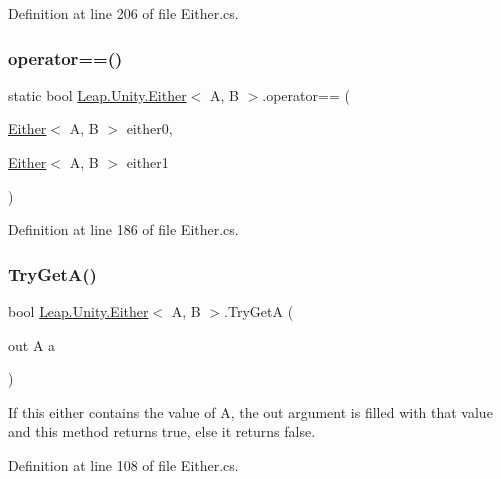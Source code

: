 Definition at line 206 of file Either.\+cs.

\mbox{\label{struct_leap_1_1_unity_1_1_either_ac635dd45bbe22cd73bb1c850d7294087}} 
\subsubsection{\texorpdfstring{operator==()}{operator==()}}
{\footnotesize\ttfamily static bool \mbox{\hyperlink{struct_leap_1_1_unity_1_1_either}{Leap.\+Unity.\+Either}}$<$ A, B $>$.operator== (\begin{DoxyParamCaption}\item[{\mbox{\hyperlink{struct_leap_1_1_unity_1_1_either}{Either}}$<$ A, B $>$}]{either0,  }\item[{\mbox{\hyperlink{struct_leap_1_1_unity_1_1_either}{Either}}$<$ A, B $>$}]{either1 }\end{DoxyParamCaption})\hspace{0.3cm}{\ttfamily [static]}}



Definition at line 186 of file Either.\+cs.

\mbox{\label{struct_leap_1_1_unity_1_1_either_a7ef635be83e9e5e874739d9f363692ef}} 
\subsubsection{\texorpdfstring{TryGetA()}{TryGetA()}}
{\footnotesize\ttfamily bool \mbox{\hyperlink{struct_leap_1_1_unity_1_1_either}{Leap.\+Unity.\+Either}}$<$ A, B $>$.Try\+GetA (\begin{DoxyParamCaption}\item[{out A}]{a }\end{DoxyParamCaption})}



If this either contains the value of A, the out argument is filled with that value and this method returns true, else it returns false. 



Definition at line 108 of file Either.\+cs.

